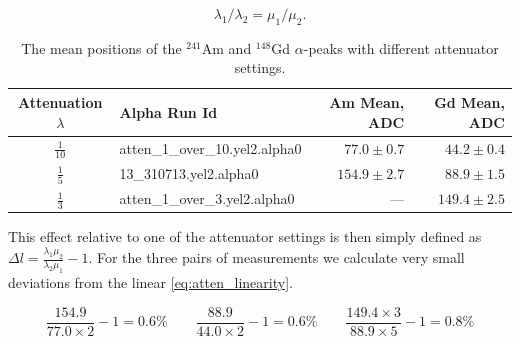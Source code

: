 \documentclass[a4paper,12pt]{article}
\newcommand\americium{${}^{241}$Am}
\newcommand\gadolinium{${}^{148}$Gd}
\begin{document}
\begin{equation}
\lambda_1/\lambda_2 = \mu_1/ \mu_2.
\label{eq:atten_linearity}
\end{equation}


\begin{table}[htb]
\caption{The mean positions of the \americium{} and \gadolinium{} $\alpha$-peaks
with different attenuator settings.}
\centering

\begin{tabular}{clrr}
\toprule
Attenuation $\lambda$ & Alpha Run Id      & Am Mean, ADC      & Gd Mean, ADC \\
\midrule
$\frac{1}{10}$  & \small{atten\_1\_over\_10.yel2.alpha0}  & $77.0\pm0.7$      & $44.2\pm0.4$ \\
\addlinespace
$\frac{1}{5}$   & \small{13\_310713.yel2.alpha0}          & $154.9\pm2.7$     & $88.9\pm1.5$ \\
\addlinespace
$\frac{1}{3}$   & \small{atten\_1\_over\_3.yel2.alpha0}   & ---\hspace{20pt}  & $149.4\pm2.5$ \\
\bottomrule
\end{tabular}

\label{table:atten}
\end{table}

\noindent
This effect relative to one of the attenuator settings is then simply defined as
$\Delta l = \frac{\lambda_1 \mu_2}{\lambda_2 \mu_1} - 1$. For the three pairs
of measurements we calculate very small deviations from the linear
\cref{eq:atten_linearity}.

\begin{equation}
\frac{154.9}{77.0 \times 2} - 1 = 0.6\%
\qquad
\frac{88.9}{44.0 \times 2} - 1 = 0.6\%
\qquad
\frac{149.4 \times 3}{88.9 \times 5} - 1 = 0.8\%
\end{equation}
\end{document}
